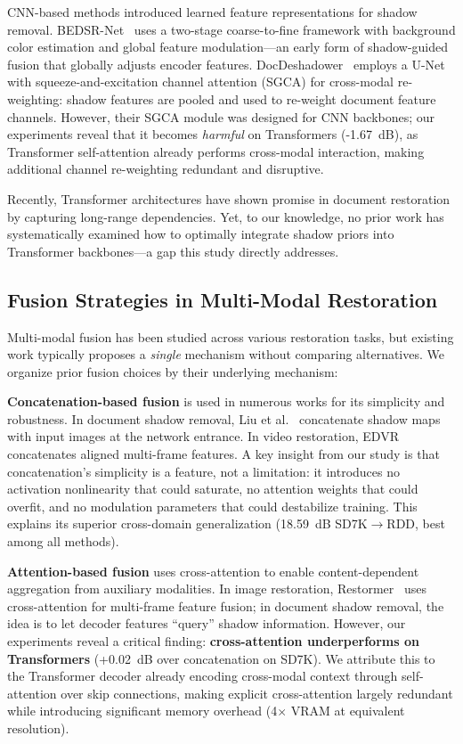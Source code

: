 \documentclass[11pt]{article}
\begin{document}
CNN-based methods introduced learned feature representations for shadow removal.
BEDSR-Net~\cite{lin2020document} uses a two-stage coarse-to-fine framework with background color estimation and global feature modulation---an early form of shadow-guided fusion that globally adjusts encoder features.
DocDeshadower~\cite{li2023single} employs a U-Net with squeeze-and-excitation channel attention (SGCA) for cross-modal re-weighting: shadow features are pooled and used to re-weight document feature channels.
However, their SGCA module was designed for CNN backbones; our experiments reveal that it becomes \textit{harmful} on Transformers (-1.67~dB), as Transformer self-attention already performs cross-modal interaction, making additional channel re-weighting redundant and disruptive.

Recently, Transformer architectures have shown promise in document restoration by capturing long-range dependencies.
Yet, to our knowledge, no prior work has systematically examined how to optimally integrate shadow priors into Transformer backbones---a gap this study directly addresses.

\subsection{Fusion Strategies in Multi-Modal Restoration}

Multi-modal fusion has been studied across various restoration tasks, but existing work typically proposes a \textit{single} mechanism without comparing alternatives.
We organize prior fusion choices by their underlying mechanism:

\textbf{Concatenation-based fusion} is used in numerous works for its simplicity and robustness.
In document shadow removal, Liu et al.~\cite{Liuspectral} concatenate shadow maps with input images at the network entrance.
In video restoration, EDVR~\cite{wang2019edvr} concatenates aligned multi-frame features.
A key insight from our study is that concatenation's simplicity is a feature, not a limitation: it introduces no activation nonlinearity that could saturate, no attention weights that could overfit, and no modulation parameters that could destabilize training.
This explains its superior cross-domain generalization (18.59~dB SD7K$\rightarrow$RDD, best among all methods).

\textbf{Attention-based fusion} uses cross-attention to enable content-dependent aggregation from auxiliary modalities.
In image restoration, Restormer~\cite{zamir2022restormer} uses cross-attention for multi-frame feature fusion; in document shadow removal, the idea is to let decoder features ``query'' shadow information.
However, our experiments reveal a critical finding: \textbf{cross-attention underperforms on Transformers} (+0.02~dB over concatenation on SD7K).
We attribute this to the Transformer decoder already encoding cross-modal context through self-attention over skip connections, making explicit cross-attention largely redundant while introducing significant memory overhead (4$\times$ VRAM at equivalent resolution).
\end{document}
